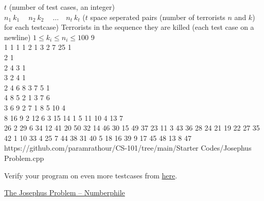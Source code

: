 \begin{testcases}
	{$t$ \hfill(number of test cases, an integer)\\
	$n_1\ k_1\ \quad n_2\ k_2\ \quad \ldots\quad n_t\ k_t$ \hfill($t$ space seperated pairs (number of terrorists $n$ and $k$) for each testcase)}
	{Terrorists in the sequence they are killed \hfill(each test case on a newline)}
	{$1 \leq k_i \leq n_i \leq 100$}
	{9\\1 1 1 1 2 1 3 2 7 25}
	{1\\2 1\\2 4 3 1\\3 2 4 1\\2 4 6 8 3 7 5 1\\4 8 5 2 1 3 7 6\\3 6 9 2 7 1 8 5 10 4\\8 16 9 2 12 6 3 15 14 1 5 11 10 4 13 7\\26 2 29 6 34 12 41 20 50 32 14 46 30 15 49 37 23 11 3 43 36 28 24 21 19 22 27 35 42 1 10 33 4 25 7 44 38 31 40 5 18 16 39 9 17 45 48 13 8 47}
	{https://github.com/paramrathour/CS-101/tree/main/Starter Codes/Josephus Problem.cpp}
\end{testcases}
\begin{note}
	Verify your program on even more testcases from \href{https://cses.fi/problemset/task/2163/}{here}.
\end{note}
\begin{funvideo}
	\href{https://youtu.be/uCsD3ZGzMgE}{The Josephus Problem -- Numberphile}
\end{funvideo}
